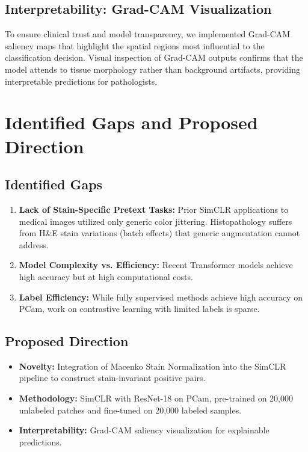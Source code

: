 \documentclass[conference]{IEEEtran}
\begin{document}
\subsection{Interpretability: Grad-CAM Visualization}
To ensure clinical trust and model transparency, we implemented Grad-CAM saliency maps that highlight the spatial regions most influential to the classification decision. Visual inspection of Grad-CAM outputs confirms that the model attends to tissue morphology rather than background artifacts, providing interpretable predictions for pathologists.

\section{Identified Gaps and Proposed Direction}

\subsection{Identified Gaps}
\begin{enumerate}
\item \textbf{Lack of Stain-Specific Pretext Tasks:} Prior SimCLR applications to medical images utilized only generic color jittering. Histopathology suffers from H\&E stain variations (batch effects) that generic augmentation cannot address.

\item \textbf{Model Complexity vs. Efficiency:} Recent Transformer models achieve high accuracy but at high computational costs.

\item \textbf{Label Efficiency:} While fully supervised methods achieve high accuracy on PCam, work on contrastive learning with limited labels is sparse.
\end{enumerate}

\subsection{Proposed Direction}
\begin{itemize}
\item \textbf{Novelty:} Integration of Macenko Stain Normalization into the SimCLR pipeline to construct stain-invariant positive pairs.
\item \textbf{Methodology:} SimCLR with ResNet-18 on PCam, pre-trained on 20,000 unlabeled patches and fine-tuned on 20,000 labeled samples.
\item \textbf{Interpretability:} Grad-CAM saliency visualization for explainable predictions.
\end{itemize}
\end{document}
